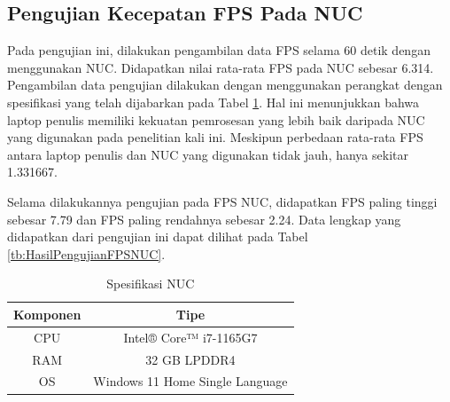 \subsection{Pengujian Kecepatan FPS Pada NUC}
Pada pengujian ini, dilakukan pengambilan data FPS selama 60 detik dengan menggunakan NUC. Didapatkan nilai rata-rata FPS pada NUC sebesar 6.314. Pengambilan data pengujian dilakukan dengan menggunakan perangkat dengan spesifikasi yang telah dijabarkan pada Tabel \ref{tb:SpesifikasiNUC}. Hal ini menunjukkan bahwa laptop penulis memiliki kekuatan pemrosesan yang lebih baik daripada NUC yang digunakan pada penelitian kali ini. Meskipun perbedaan rata-rata FPS antara laptop penulis dan NUC yang digunakan tidak jauh, hanya sekitar 1.331667.

Selama dilakukannya pengujian pada FPS NUC, didapatkan FPS paling tinggi sebesar 7.79 dan FPS paling rendahnya sebesar 2.24. Data lengkap yang didapatkan dari pengujian ini dapat dilihat pada Tabel \ref{tb:HasilPengujianFPSNUC}.

\begin{longtable}{|c|c|}
  \caption{Spesifikasi NUC}
  \label{tb:SpesifikasiNUC}                                   \\
  \hline
  \rowcolor[HTML]{C0C0C0}
  \textbf{Komponen} & \textbf{Tipe} \\
  \hline
  CPU         & Intel® Core™ i7-1165G7              \\
  \hline
  RAM         & 32 GB LPDDR4              \\
  \hline
  OS         & Windows 11 Home Single Language              \\
  \hline
\end{longtable}



